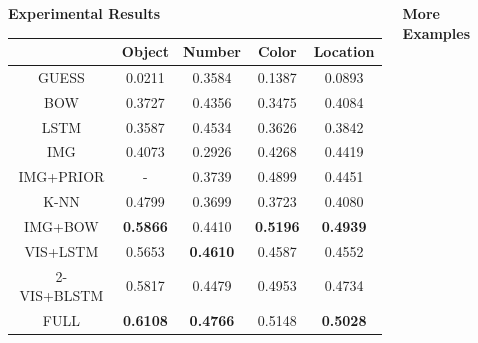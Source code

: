 \documentclass{beamer}
\renewcommand{\*}[1]{\textbf{#1}}
\begin{document}
\begin{frame}{}
\begin{columns}[T]
\begin{column}{0.32\linewidth}
\begin{block}{\bf{\large Experimental Results}}
\begin{table}[t!]
\begin{center}
\begin{tabular}{c c c c c}
\hline
           &   Object  &   Number &   Color   & Location \\
\hline
GUESS      &   0.0211  &   0.3584 &   0.1387  & 0.0893   \\
BOW        &   0.3727  &   0.4356 &   0.3475  & 0.4084   \\
LSTM       &   0.3587  &   0.4534 &   0.3626  & 0.3842   \\
IMG        &   0.4073  &   0.2926 &   0.4268  & 0.4419   \\
IMG+PRIOR  &   -       &   0.3739 &   0.4899  & 0.4451   \\
K-NN       &   0.4799  &   0.3699 &   0.3723  & 0.4080   \\
IMG+BOW    &\*{0.5866} &   0.4410 &\*{0.5196} &\*{0.4939}\\
VIS+LSTM   &   0.5653  &\*{0.4610}&   0.4587  & 0.4552   \\
2-VIS+BLSTM&   0.5817  &   0.4479 &   0.4953  & 0.4734   \\
FULL       &\*{0.6108} &\*{0.4766}&   0.5148  &\*{0.5028}\\
\hline
\end{tabular}

\end{center}
\end{table}

\end{block}
\vfill

\endminipage
\end{column}

\begin{column}{0.32\linewidth}
\minipage[t][0.9\textheight][s]{\columnwidth}

\begin{block}{\bf{\large More Examples}}

\end{block}
\end{column}
\end{columns}
\end{frame}
\end{document}
